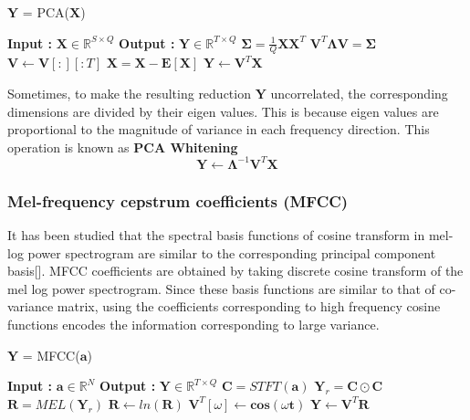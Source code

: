 \begin{algorithm}
  \caption{$\textbf{Y}$ = PCA($\textbf{X}$)}\label{PCA}
  \begin{algorithmic}[1]
    \Statex \textbf{Input :} $\textbf{X} \in \mathbb{R}^{S \times Q}$
    \Statex \textbf{Output :} $\textbf{Y} \in \mathbb{R}^{T \times Q}$
      \State $\bm{\Sigma} = \frac{1}{Q}\textbf{X}\textbf{X}^{T}$ 
      \State $\textbf{V}^{T} \bm{\Lambda} \textbf{V} = \bm{\Sigma}$ 
      \State $\textbf{V} \leftarrow \textbf{V}[:][:T]$ 
      \State $\textbf{\^{X}} = \textbf{X} - \textbf{E}[\textbf{X}]$
      \State $\textbf{Y} \leftarrow \textbf{V}^{T}\textbf{\^{X}}$
  \end{algorithmic}
\end{algorithm}
\FloatBarrier
\bigskip

\noindent Sometimes, to make the resulting reduction $\textbf{Y}$ uncorrelated, the corresponding dimensions are divided by their eigen values. This is because eigen values are proportional to the magnitude of variance in each frequency direction. This operation is known as \textbf{PCA Whitening}   
\[
\textbf{Y} \leftarrow \bm{\Lambda}^{-1}\textbf{V}^{T}\textbf{\^{X}}
\]
\bigskip

\subsubsection{Mel-frequency cepstrum coefficients (MFCC)}
It has been studied that the spectral basis functions of cosine transform in mel-log power spectrogram are similar to the corresponding principal component basis[]. MFCC coefficients are obtained by taking discrete cosine transform of the mel log power spectrogram. Since these basis functions are similar to that of co-variance matrix, using the coefficients corresponding to high frequency cosine functions encodes the information corresponding to large variance. 
\begin{algorithm}
  \caption{$\textbf{Y}$ = MFCC($\textbf{a}$) }\label{MFCC}
  \begin{algorithmic}[1]
    \Statex \textbf{Input :} $\textbf{a} \in \mathbb{R}^{N}$
    \Statex \textbf{Output :} $\textbf{Y} \in \mathbb{R}^{T \times Q}$ 
    \State $\textbf{C} = STFT(\textbf{a})$ 
    \State $\textbf{Y}_{r} = \textbf{C} \odot \textbf{C}$ 
    \State $\textbf{R} = MEL(\textbf{Y}_{r})$ 
    \State $\textbf{R} \leftarrow ln(\textbf{R})$
    \State $\textbf{V}^{T}[ \omega ] \leftarrow \textbf{cos}( \omega \textbf{t})$  
    \EndFor
    \State $\textbf{Y} \leftarrow \textbf{V}^{T}\textbf{R}$
  \end{algorithmic}
\end{algorithm}
 

